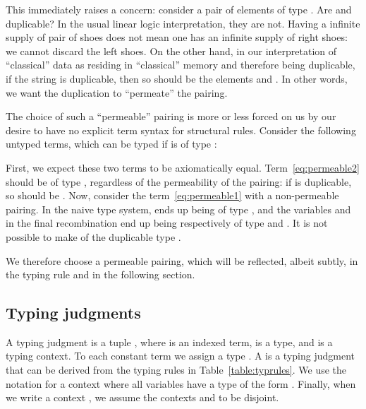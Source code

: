 \documentclass{llncs}
\begin{document}
This immediately raises a concern: consider a pair of elements
 of type . Are  and 
duplicable? In the usual linear logic interpretation, they are not. Having a infinite supply of pair of shoes does not mean
one has an infinite supply of right shoes: we cannot discard the left
shoes. On the other hand, in our interpretation of ``classical'' data as residing in ``classical'' memory and therefore being duplicable, if the string
 is duplicable, then so should be the elements  and .
In other words, we want the duplication to ``permeate'' the pairing.

The choice of such a ``permeable'' pairing is more
or less forced on us by our desire to have no explicit term syntax for
structural rules. Consider the following untyped terms, 
which can be typed if  is of type :

First, we expect these two terms to be axiomatically
equal. Term~\eqref{eq:permeable2} should be of type
, regardless of the permeability
of the pairing: if  is duplicable, so should be
. Now, consider the term~\eqref{eq:permeable1} with a
non-permeable pairing. In the naive type system,  ends up being of type , and the variables  and  in the final
recombination end up being respectively of type  and
. It is not possible to make  of the duplicable type
. 

We therefore choose a permeable pairing, which will be reflected,
albeit subtly, in the typing rule  and  in
the following section.


\subsection{Typing judgments}
\label{sec:typjudg}

A typing judgment
is a tuple , where  is an indexed term,  is a
type, and  is a typing context.
To each constant term  we assign a type .
A  is a typing judgment that can be
derived from the typing rules in Table~\ref{table:typrules}.
We use the notation  for a context where all variables
have a type of the form . Finally, when we write a context
, we assume the contexts  and  to be
disjoint.
\end{document}
